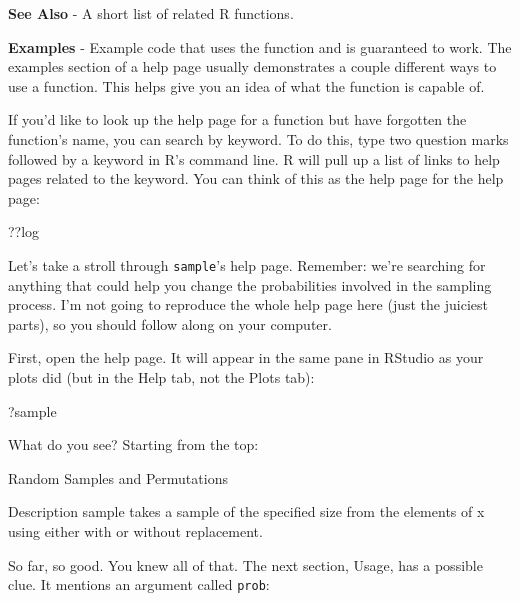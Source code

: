 \documentclass[
  letterpaper,
  DIV=11,
  numbers=noendperiod]{scrbook}
\newenvironment{Shaded}{\begin{snugshade}}{\end{snugshade}}
\newcommand{\NormalTok}[1]{\textcolor[rgb]{0.00,0.23,0.31}{#1}}
\begin{document}
\textbf{See Also} - A short list of related R functions.

\textbf{Examples} - Example code that uses the function and is
guaranteed to work. The examples section of a help page usually
demonstrates a couple different ways to use a function. This helps give
you an idea of what the function is capable of.

If you'd like to look up the help page for a function but have forgotten
the function's name, you can search by keyword. To do this, type two
question marks followed by a keyword in R's command line. R will pull up
a list of links to help pages related to the keyword. You can think of
this as the help page for the help page:

\begin{Shaded}
\begin{Highlighting}[]
\NormalTok{??log}
\end{Highlighting}
\end{Shaded}

Let's take a stroll through \texttt{sample}'s help page. Remember: we're
searching for anything that could help you change the probabilities
involved in the sampling process. I'm not going to reproduce the whole
help page here (just the juiciest parts), so you should follow along on
your computer.

First, open the help page. It will appear in the same pane in RStudio as
your plots did (but in the Help tab, not the Plots tab):

\begin{Shaded}
\begin{Highlighting}[]
\NormalTok{?sample}
\end{Highlighting}
\end{Shaded}

What do you see? Starting from the top:

\begin{Shaded}
\begin{Highlighting}[]
\NormalTok{Random Samples and Permutations}

\NormalTok{Description}
\NormalTok{    sample takes a sample of the specified size from the elements of x using }
\NormalTok{either with or without replacement.}
\end{Highlighting}
\end{Shaded}

So far, so good. You knew all of that. The next section, Usage, has a
possible clue. It mentions an argument called \texttt{prob}:
\end{document}
